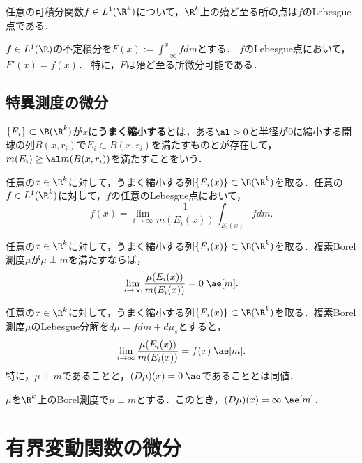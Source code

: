 \documentclass[uplatex, dvipdfmx]{jsreport}
\begin{document}
\begin{theorem}
    任意の可積分関数$f\in L^1(\R^k)$について，$\R^k$上の殆ど至る所の点は$f$のLebesgue点である．
\end{theorem}

\begin{theorem}
    $f\in L^1(\R)$の不定積分を$F(x):=\int^x_{-\infty}fdm$とする．
    $f$のLebesgue点において，$F'(x)=f(x)$．
    特に，$F$は殆ど至る所微分可能である．
\end{theorem}

\subsection{特異測度の微分}

\begin{definition}
    $\{E_i\}\subset\B(\R^k)$が$x$に\textbf{うまく縮小する}とは，ある$\al>0$と半径が$0$に縮小する開球の列$B(x,r_i)$で$E_i\subset B(x,r_i)$を満たすものとが存在して，$m(E_i)\ge\al m(B(x,r_i))$を満たすことをいう．
\end{definition}

\begin{theorem}
    任意の$x\in\R^k$に対して，うまく縮小する列$\{E_i(x)\}\subset\B(\R^k)$を取る．任意の$f\in L^1(\R^k)$に対して，$f$の任意のLebesgue点において，
    \[f(x)=\lim_{i\to\infty}\frac{1}{m(E_i(x))}\int_{E_i(x)}fdm.\]
\end{theorem}

\begin{theorem}
    任意の$x\in\R^k$に対して，うまく縮小する列$\{E_i(x)\}\subset\B(\R^k)$を取る．複素Borel測度$\mu$が$\mu\perp m$を満たすならば，
    \[\lim_{i\to\infty}\frac{\mu(E_i(x))}{m(E_i(x))}=0\;\ae[m].\]
\end{theorem}

\begin{theorem}[複素測度の場合のまとめ]
    任意の$x\in\R^k$に対して，うまく縮小する列$\{E_i(x)\}\subset\B(\R^k)$を取る．複素Borel測度$\mu$のLebesgue分解を$d\mu=fdm+d\mu_s$とすると，
    \[\lim_{i\to\infty}\frac{\mu(E_i(x))}{m(E_i(x))}=f(x)\;\ae[m].\]
    特に，$\mu\perp m$であることと，$(D\mu)(x)=0\;\ae$であることとは同値．
\end{theorem}

\begin{theorem}[測度の場合]
    $\mu$を$\R^k$上のBorel測度で$\mu\perp m$とする．このとき，$(D\mu)(x)=\infty\;\ae[m]$．
\end{theorem}

\section{有界変動関数の微分}
\end{document}
